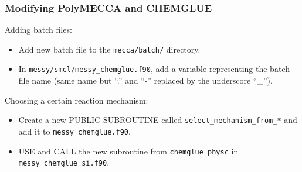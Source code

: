 \documentclass[a4paper,twoside]{article}
\begin{document}
\subsubsection{Modifying PolyMECCA and CHEMGLUE}

Adding batch files:

\begin{itemize}
\item Add new batch file to the \verb|mecca/batch/| directory.
\item In \verb|messy/smcl/messy_chemglue.f90|, add a variable
  representing the batch file name (same name but ``.'' and ``-''
  replaced by the underscore ``\_'').
\end{itemize}

Choosing a certain reaction mechanism:

\begin{itemize}
\item Create a new PUBLIC SUBROUTINE called
  \verb|select_mechanism_from_*| and add it to
  \verb|messy_chemglue.f90|.
\item USE and CALL the new subroutine from \verb|chemglue_physc| in
  \verb|messy_chemglue_si.f90|.
\end{itemize}


\printindex
\end{document}
